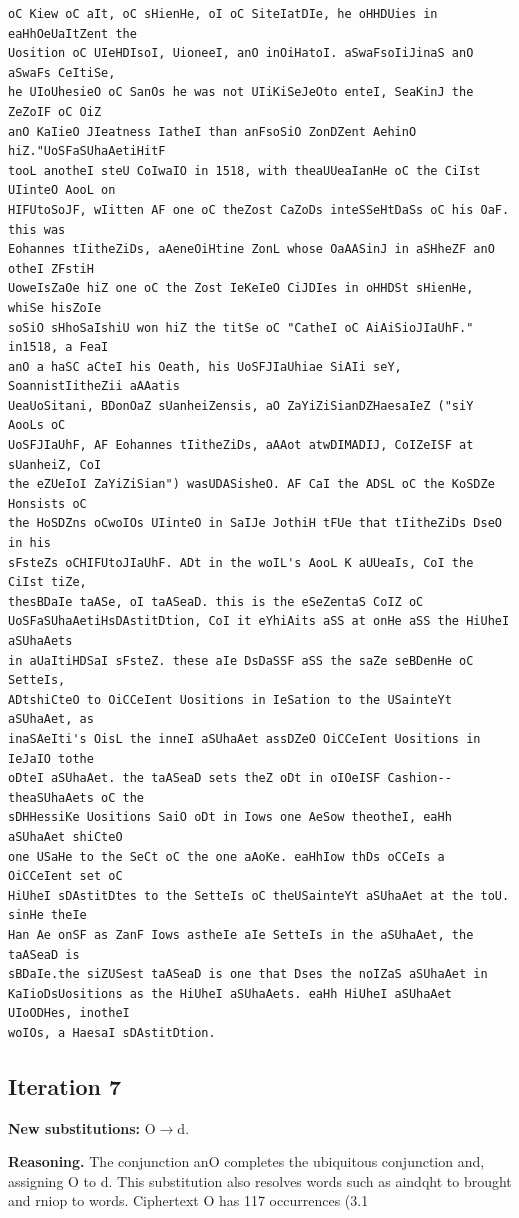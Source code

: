 \documentclass[12pt,a4paper]{article}
\begin{document}
\begin{lstlisting}[caption={Complete text after iteration 6}, label={lst:iter6}]
oC Kiew oC aIt, oC sHienHe, oI oC SiteIatDIe, he oHHDUies in eaHhOeUaItZent the
Uosition oC UIeHDIsoI, UioneeI, anO inOiHatoI. aSwaFsoIiJinaS anO aSwaFs CeItiSe,
he UIoUhesieO oC SanOs he was not UIiKiSeJeOto enteI, SeaKinJ the ZeZoIF oC OiZ
anO KaIieO JIeatness IatheI than anFsoSiO ZonDZent AehinO hiZ."UoSFaSUhaAetiHitF
tooL anotheI steU CoIwaIO in 1518, with theaUUeaIanHe oC the CiIst UIinteO AooL on
HIFUtoSoJF, wIitten AF one oC theZost CaZoDs inteSSeHtDaSs oC his OaF. this was
Eohannes tIitheZiDs, aAeneOiHtine ZonL whose OaAASinJ in aSHheZF anO otheI ZFstiH
UoweIsZaOe hiZ one oC the Zost IeKeIeO CiJDIes in oHHDSt sHienHe, whiSe hisZoIe
soSiO sHhoSaIshiU won hiZ the titSe oC "CatheI oC AiAiSioJIaUhF." in1518, a FeaI
anO a haSC aCteI his Oeath, his UoSFJIaUhiae SiAIi seY, SoannistIitheZii aAAatis
UeaUoSitani, BDonOaZ sUanheiZensis, aO ZaYiZiSianDZHaesaIeZ ("siY AooLs oC
UoSFJIaUhF, AF Eohannes tIitheZiDs, aAAot atwDIMADIJ, CoIZeISF at sUanheiZ, CoI
the eZUeIoI ZaYiZiSian") wasUDASisheO. AF CaI the ADSL oC the KoSDZe Honsists oC
the HoSDZns oCwoIOs UIinteO in SaIJe JothiH tFUe that tIitheZiDs DseO in his
sFsteZs oCHIFUtoJIaUhF. ADt in the woIL's AooL K aUUeaIs, CoI the CiIst tiZe,
thesBDaIe taASe, oI taASeaD. this is the eSeZentaS CoIZ oC
UoSFaSUhaAetiHsDAstitDtion, CoI it eYhiAits aSS at onHe aSS the HiUheI aSUhaAets
in aUaItiHDSaI sFsteZ. these aIe DsDaSSF aSS the saZe seBDenHe oC SetteIs,
ADtshiCteO to OiCCeIent Uositions in IeSation to the USainteYt aSUhaAet, as
inaSAeIti's OisL the inneI aSUhaAet assDZeO OiCCeIent Uositions in IeJaIO tothe
oDteI aSUhaAet. the taASeaD sets theZ oDt in oIOeISF Cashion--theaSUhaAets oC the
sDHHessiKe Uositions SaiO oDt in Iows one AeSow theotheI, eaHh aSUhaAet shiCteO
one USaHe to the SeCt oC the one aAoKe. eaHhIow thDs oCCeIs a OiCCeIent set oC
HiUheI sDAstitDtes to the SetteIs oC theUSainteYt aSUhaAet at the toU. sinHe theIe
Han Ae onSF as ZanF Iows astheIe aIe SetteIs in the aSUhaAet, the taASeaD is
sBDaIe.the siZUSest taASeaD is one that Dses the noIZaS aSUhaAet in
KaIioDsUositions as the HiUheI aSUhaAets. eaHh HiUheI aSUhaAet UIoODHes, inotheI
woIOs, a HaesaI sDAstitDtion.
\end{lstlisting}

\clearpage
\subsection{Iteration 7}
\textbf{New substitutions:} O$\to$d.

\textbf{Reasoning.} The conjunction anO completes the ubiquitous conjunction and, assigning O to d. This substitution also resolves words such as aindqht to brought and rniop to words. Ciphertext O has 117 occurrences (3.1%
\end{document}
